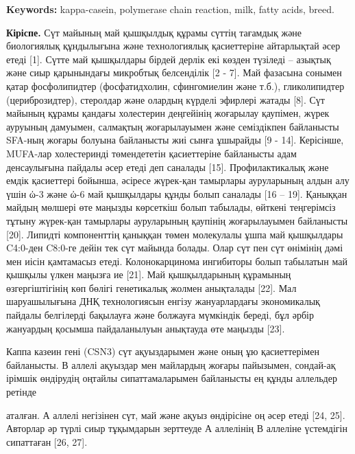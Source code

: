 {\bfseries Keywords:} kappa-casein, polymerase chain reaction, milk, fatty
acids, breed.
\begin{multicols}{2}

{\bfseries Кіріспе.} Сүт майының май қышқылдық құрамы сүттің тағамдық және
биологиялық құндылығына және технологиялық қасиеттеріне айтарлықтай әсер
етеді {[}1{]}. Сүтте май қышқылдары бірдей дерлік екі көзден түзіледі --
азықтық және сиыр қарынындағы микробтық белсенділік {[}2 - 7{]}. Май
фазасына сонымен қатар фосфолипидтер (фосфатидхолин, сфингомиелин және
т.б.), гликолипидтер (цериброзидтер), стеролдар және олардың күрделі
эфирлері жатады {[}8{]}. Сүт майының құрамы қандағы холестерин
деңгейінің жоғарылау қаупімен, жүрек ауруының дамуымен, салмақтың
жоғарылауымен және семіздікпен байланысты SFA-ның жоғары болуына
байланысты жиі сынға ұшырайды {[}9 - 14{]}. Керісінше, MUFA-лар
холестеринді төмендететін қасиеттеріне байланысты адам денсаулығына
пайдалы әсер етеді деп саналады {[}15{]}. Профилактикалық және емдік
қасиеттері бойынша, әсіресе жүрек-қан тамырлары ауруларының алдын алу
үшін ὠ-3 және ὠ-6 май қышқылдары құнды болып саналады {[}16 -- 19{]}.
Қаныққан майдың мөлшері өте маңызды көрсеткіш болып табылады, өйткені
теңгерімсіз тұтыну жүрек-қан тамырлары ауруларының қаупінің
жоғарылауымен байланысты {[}20{]}. Липидті компоненттің қаныққан төмен
молекулалы ұшпа май қышқылдары C4:0-ден C8:0-ге дейін тек сүт майында
болады. Олар сүт пен сүт өнімінің дәмі мен иісін қамтамасыз етеді.
Колонокарцинома ингибиторы болып табылатын май қышқылы үлкен маңызға ие
{[}21{]}. Май қышқылдарының құрамының өзгергіштігінің көп бөлігі
генетикалық жолмен анықталады {[}22{]}. Мал шаруашылығына ДНҚ
технологиясын енгізу жануарлардағы экономикалық пайдалы белгілерді
бақылауға және болжауға мүмкіндік береді, бұл әрбір жануардың қосымша
пайдаланылуын анықтауда өте маңызды {[}23{]}.

Каппа казеин гені (CSN3) сүт ақуыздарымен және оның ұю қасиеттерімен
байланысты. В аллелі ақуыздар мен майлардың жоғары пайызымен, сондай-ақ
ірімшік өндірудің оңтайлы сипаттамаларымен байланысты ең құнды аллельдер
ретінде

аталған. А аллелі негізінен сүт, май және ақуыз өндірісіне оң әсер етеді
{[}24, 25{]}. Авторлар әр түрлі сиыр тұқымдарын зерттеуде А аллелінің В
аллеліне үстемдігін сипаттаған {[}26, 27{]}.


\end{multicols}
